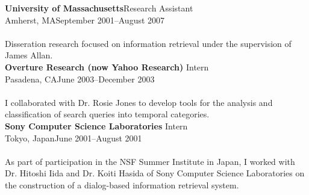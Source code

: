 \documentclass{article}
\begin{document}
\noindent\textbf{University of Massachusetts}\hfill Research Assistant\\
Amherst, MA\hfill  September 2001–August 2007\\\\
Disseration research focused on information retrieval under the supervision of James Allan.\\
%


\noindent\textbf{Overture Research (now Yahoo Research) }\hfill Intern\\
Pasadena, CA\hfill  June 2003–December 2003\\\\
I collaborated with Dr. Rosie Jones to develop tools for the analysis and classification of search queries into temporal categories. \\%

\noindent\textbf{Sony Computer Science Laboratories }\hfill Intern\\
Tokyo, Japan\hfill  June 2001–August 2001\\\\
As part of participation in the NSF Summer Institute in Japan, I worked with Dr. Hitoshi Iida and Dr. Koiti Hasida of Sony Computer Science Laboratories on the construction of a dialog-based information retrieval system.\\
\end{document}
